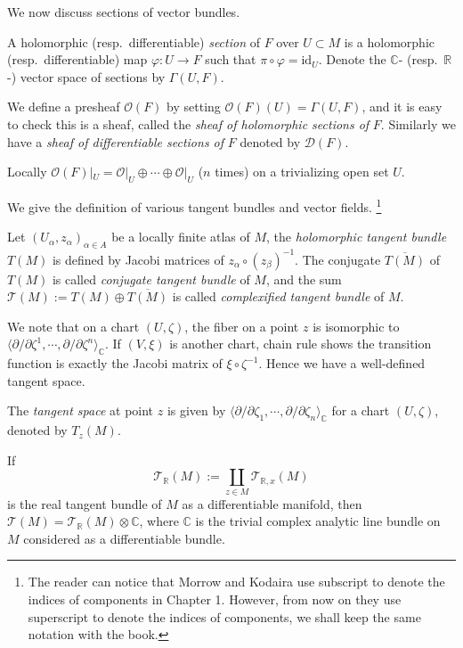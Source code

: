 We now discuss sections of vector bundles.
\begin{defn}
    A holomorphic (resp.\ differentiable) \emph{section} of $F$ over $U\subset M$ is a holomorphic (resp.\ differentiable) map $\varphi:U\to F$ such that $\pi\circ\varphi=\mathrm{id}_U$.
    Denote the $\mathbb{C}$- (resp.\ $\mathbb{R}$-) vector space of sections by $\Gamma(U,F)$.

    We define a presheaf $\mathcal{O}(F)$ by setting $\mathcal{O}(F)(U)=\Gamma(U,F)$, and it is easy to check this is a sheaf, called the \emph{sheaf of holomorphic sections of} $F$.
    Similarly we have a \emph{sheaf of differentiable sections of} $F$ denoted by $\mathcal{D}(F)$.
\end{defn}

Locally $\mathcal{O}(F)|_U=\mathcal{O}|_U\oplus\cdots\oplus\mathcal{O}|_U$ ($n$ times) on a trivializing open set $U$.

We give the definition of various tangent bundles and vector fields.
\footnote{
    The reader can notice that Morrow and Kodaira use subscript to denote the indices of components in Chapter 1.
    However, from now on they use superscript to denote the indices of components, we shall keep the same notation with the book.
}
\begin{defn}
    Let $(U_\alpha,z_\alpha)_{\alpha\in A}$ be a locally finite atlas of $M$, the \emph{holomorphic tangent bundle} $T(M)$ is defined by Jacobi matrices of $z_\alpha\circ(z_\beta)^{-1}$.
    The conjugate $\overline{T(M)}$ of $T(M)$ is called \emph{conjugate tangent bundle} of $M$, and the sum $\mathcal{T}(M):=T(M)\oplus\overline{T(M)}$ is called \emph{complexified tangent bundle} of $M$.
\end{defn}

We note that on a chart $(U,\zeta)$, the fiber on a point $z$ is isomorphic to $\langle\partial/\partial{\zeta^1},\cdots,\partial/\partial{\zeta^n}\rangle_\mathbb{C}$.
If $(V,\xi)$ is another chart, chain rule shows the transition function is exactly the Jacobi matrix of $\xi\circ\zeta^{-1}$.
Hence we have a well-defined tangent space.
\begin{defn}
    The \emph{tangent space} at point $z$ is given by $\langle\partial/\partial{\zeta_1},\cdots,\partial/\partial{\zeta_n}\rangle_\mathbb{C}$ for a chart $(U,\zeta)$, denoted by $T_z(M)$.
\end{defn}

\begin{rem}
    If
    \[\mathcal{T}_\mathbb{R}(M):=\coprod_{z\in M}\mathcal{T}_{\mathbb{R},x}(M)\]
    is the real tangent bundle of $M$ as a differentiable manifold, then $\mathcal{T}(M)=\mathcal{T}_\mathbb{R}(M)\otimes\mathbb{C}$, where $\mathbb{C}$ is the trivial complex analytic line bundle on $M$ considered as a differentiable bundle.
\end{rem}

